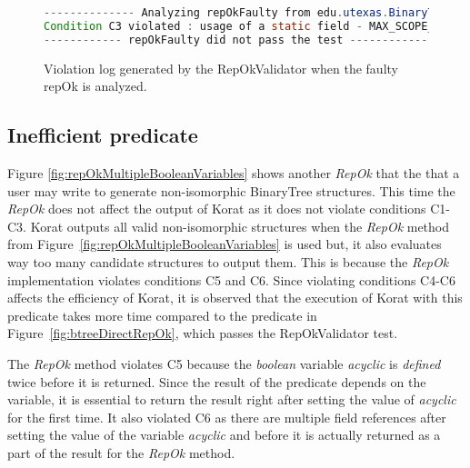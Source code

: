 \begin{figure}
\centering
\begin{lstlisting}[language=Java]
-------------- Analyzing repOkFaulty from edu.utexas.BinaryTree ------------
Condition C3 violated : usage of a static field - MAX_SCOPE_PARAM from class edu.utexas.BinaryTree$Settings at line 54 inside repOKEfficient in edu.utexas.BinaryTree
------------ repOkFaulty did not pass the test ------------
\end{lstlisting}
\caption{Violation log generated by the RepOkValidator when the faulty repOk is analyzed.}
\label{fig:repOkKoratSatisfyCorrectnessLog}
\end{figure}

\subsection{Inefficient predicate}
\label{sec:inefficient-predicate}
Figure \ref{fig:repOkMultipleBooleanVariables} shows another
\emph{RepOk} that the that a user may write to generate non-isomorphic
BinaryTree structures. This time the \emph{RepOk} does not affect the
output of Korat as it does not violate conditions C1-C3. Korat outputs
all valid non-isomorphic structures when the \emph{RepOk} method from
Figure~\ref{fig:repOkMultipleBooleanVariables} is used but, it also
evaluates way too many candidate structures to output them. This is
because the \emph{RepOk} implementation violates conditions C5 and
C6. Since violating conditions C4-C6 affects the efficiency of Korat,
it is observed that the execution of Korat with this predicate takes
more time compared to the predicate in Figure~\ref{fig:btreeDirectRepOk}, which passes the RepOkValidator test.

\para The \emph{RepOk} method violates C5 because the \emph{boolean}
variable \emph{acyclic} is \emph{defined} twice before it is
returned. Since the result of the predicate depends on the variable,
it is essential to return the result right after setting the value of
\emph{acyclic} for the first time. It also violated C6 as there are
multiple field references after setting the value of the variable
\emph{acyclic} and before it is actually returned as a part of the
result for the \emph{RepOk} method.


